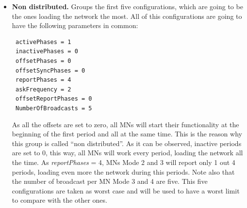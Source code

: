 \begin{itemize}
 \item \textbf{Non distributed. }Groups the first five configurations, which are going to be the ones loading the network the most. All of this
configurations are going to have the following parameters in common:
\begin{verbatim}
 activePhases = 1
 inactivePhases = 0
 offsetPhases = 0
 offsetSyncPhases = 0
 reportPhases = 4 
 askFrequency = 2
 offsetReportPhases = 0
 NumberOfBroadcasts = 5
\end{verbatim}
As all the offsets are set to zero, all \acp{MN} will start their functionality at the beginning of the first period and all at the same
time. This is the reason why this group is called ``non distributed''. As it can be observed, inactive periods are set to 0, this way, all \acp{MN} will 
work every period, loading the network all the time. As \textit{reportPhases} = 4, \acp{MN} Mode 2 and 3 will report only 1 out 4 periods, loading even
more the network during this periods. Note also that the number of broadcast per \ac{MN} Mode 3 and 4 are five. This five configurations are taken as
 worst case and will be used to have a worst limit to compare with the other ones.


\end{itemize}
